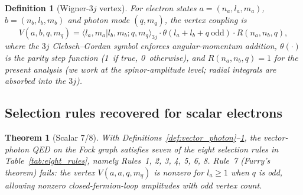 \documentclass[11pt]{article}
\newtheorem{theorem}{Theorem}
\newtheorem{definition}{Definition}
\begin{document}
\begin{definition}[Wigner-3$j$ vertex]
\label{def:vertex}
For electron states $a = (n_a, l_a, m_a)$, $b = (n_b, l_b, m_b)$ and
photon mode $(q, m_q)$, the vertex coupling is
\begin{equation}
   V(a, b, q, m_q) = \langle l_a, m_a | l_b, m_b ; q, m_q \rangle_{3j}
   \cdot \theta(l_a + l_b + q ~ \text{odd}) \cdot R(n_a, n_b, q),
   \label{eq:vertex}
\end{equation}
where the $3j$ Clebsch--Gordan symbol enforces angular-momentum
addition, $\theta(\cdot)$ is the parity step function (1~if true,
0~otherwise), and $R(n_a, n_b, q) = 1$ for the present analysis (we
work at the spinor-amplitude level; radial integrals are absorbed
into the $3j$).
\end{definition}

\subsection{Selection rules recovered for scalar electrons}

\begin{theorem}[Scalar 7/8]
\label{thm:scalar_7_of_8}
With Definitions~\ref{def:vector_photon}--\ref{def:vertex}, the
vector-photon QED on the Fock graph satisfies seven of the eight
selection rules in Table~\ref{tab:eight_rules}, namely Rules~1, 2, 3,
4, 5, 6, 8.  Rule~7 (Furry's theorem) fails: the vertex
$V(a, a, q, m_q)$ is nonzero for $l_a \ge 1$ when $q$ is odd, allowing
nonzero closed-fermion-loop amplitudes with odd vertex count.
\end{theorem}
\end{document}
